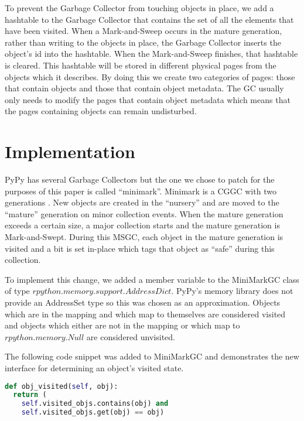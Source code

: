 \documentclass{article}
\begin{document}
\begin{sloppypar}
To prevent the Garbage Collector from touching objects in place, we add a hashtable to the Garbage Collector that contains the set of all the elements that have been visited.  When a Mark-and-Sweep occurs in the mature generation, rather than writing to the objects in place, the Garbage Collector inserts the object's id into the hashtable.  When the Mark-and-Sweep finishes, that hashtable is cleared.  This hashtable will be stored in different physical pages from the objects which it describes.  By doing this we create two categories of pages: those that contain objects and those that contain object metadata.  The GC usually only needs to modify the pages that contain object metadata which means that the pages containing objects can remain undisturbed.  

\section{Implementation}\label{sec:implementation}

PyPy has several Garbage Collectors but the one we chose to patch for the purposes of this paper is called ``minimark''.  Minimark is a CGGC with two generations \cite{pypy-doc}.  New objects are created in the ``nursery'' and are moved to the ``mature'' generation on minor collection events.  When the mature generation exceeds a certain size, a major collection starts and the mature generation is Mark-and-Swept.  During this MSGC, each object in the mature generation is visited and a bit is set in-place which tags that object as ``safe'' during this collection.  

To implement this change, we added a member variable to the MiniMarkGC class of type $rpython.memory.support.AddressDict$.  PyPy's memory library does not provide an AddressSet type so this was chosen as an approximation.  Objects which are in the mapping and which map to themselves are considered visited and objects which either are not in the mapping or which map to $rpython.memory.Null$ are considered unvisited.  

The following code snippet was added to MiniMarkGC and demonstrates the new interface for determining an object's visited state.

\noindent
\begin{minipage}{\linewidth}
\begin{lstlisting}[language=python]
def obj_visited(self, obj):
  return (
    self.visited_objs.contains(obj) and
    self.visited_objs.get(obj) == obj)


\end{lstlisting}
\end{minipage}
\end{sloppypar}
\end{document}
